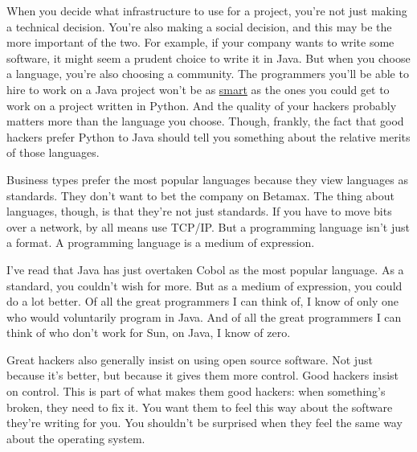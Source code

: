 When
                    you decide what infrastructure to use for a project, you're
                    not just making a technical decision. You're also making a
                    social decision, and this may be the more important of the
                    two. For example, if your company wants to write some
                    software, it might seem a prudent choice to write it in
                    Java. But when you choose a language, you're also choosing a
                    community. The programmers you'll be able to hire to work on
                    a Java project won't be as \href{http://www.paulgraham.com/pypar.html}{smart} as
                    the ones you could get to work on a project written in
                    Python. And the quality of your hackers probably matters
                    more than the language you choose. Though, frankly, the fact
                    that good hackers prefer Python to Java should tell you
                    something about the relative merits of those languages.

Business
                    types prefer the most popular languages because they view
                    languages as standards. They don't want to bet the company
                    on Betamax. The thing about languages, though, is that
                    they're not just standards. If you have to move bits over a
                    network, by all means use TCP/IP. But a programming language
                    isn't just a format. A programming language is a medium of
                    expression.

I've read that Java has just
                    overtaken Cobol as the most popular language. As a standard,
                    you couldn't wish for more. But as a medium of expression,
                    you could do a lot better. Of all the great programmers I
                    can think of, I know of only one who would voluntarily
                    program in Java. And of all the great programmers I can
                    think of who don't work for Sun, on Java, I know of zero.

Great
                    hackers also generally insist on using open source software.
                    Not just because it's better, but because it gives them more
                    control. Good hackers insist on control. This is part of
                    what makes them good hackers: when something's broken, they
                    need to fix it. You want them to feel this way about the
                    software they're writing for you. You shouldn't be surprised
                    when they feel the same way about the operating system.

